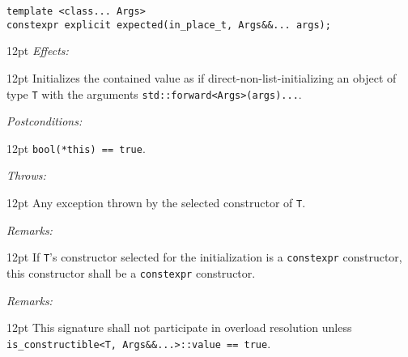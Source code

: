 \documentclass[a4paper,10pt]{article}
\newcommand{\cpp}[1]{\lstinline{#1}}
\newcommand{\wordingItem}[1]{\noindent\textit{#1:}}
\newenvironment{wordingTextItem}[1]{\wordingItem{#1}\vspace{7pt}\noindent\begin{adjustwidth}{12pt}{}}{\vspace{7pt}\end{adjustwidth}}
\newenvironment{wordingPara}{\begin{adjustwidth}{12pt}{}}{\end{adjustwidth}}
\begin{document}
\begin{lstlisting}[xleftmargin=0pt]
template <class... Args>
constexpr explicit expected(in_place_t, Args&&... args); 
\end{lstlisting}
\begin{wordingPara}
\begin{wordingTextItem}{Effects}
Initializes the contained value as if direct-non-list-initializing an object of type \cpp{T} with the arguments \cpp{std::forward<Args>(args)...}.
\end{wordingTextItem}
\begin{wordingTextItem}{Postconditions}
\cpp{bool(*this) == true}.
\end{wordingTextItem}
\begin{wordingTextItem}{Throws}
Any exception thrown by the selected constructor of \cpp{T}.
\end{wordingTextItem}
\begin{wordingTextItem}{Remarks}
If \cpp{T}'s constructor selected for the initialization is a \cpp{constexpr} constructor, this constructor shall be a \cpp{constexpr} constructor.
\end{wordingTextItem}
\begin{wordingTextItem}{Remarks}
This signature shall not participate in overload resolution unless\\
\cpp{is_constructible<T, Args&&...>::value == true}.
\end{wordingTextItem}
\end{wordingPara}
\end{document}
